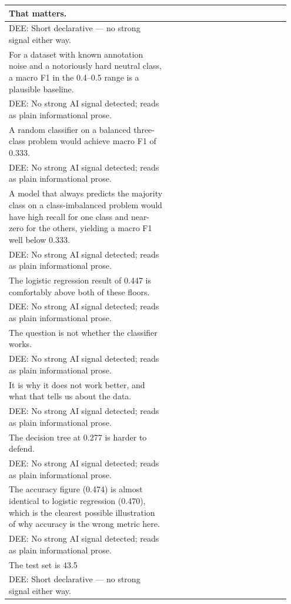 \documentclass[11pt]{article}
\begin{document}
\begin{longtable}{|p{0.55\linewidth}|p{0.40\linewidth}|}
\hline
That matters. & \\[2pt]
\hline
DEE: Short declarative --- no strong signal either way. & \\
\hline
For a dataset with known annotation noise and a notoriously hard neutral class, a macro F1 in the 0.4--0.5 range is a plausible baseline. & \\[2pt]
\hline
DEE: No strong AI signal detected; reads as plain informational prose. & \\
\hline
A random classifier on a balanced three-class problem would achieve macro F1 of 0.333. & \\[2pt]
\hline
DEE: No strong AI signal detected; reads as plain informational prose. & \\
\hline
A model that always predicts the majority class on a class-imbalanced problem would have high recall for one class and near-zero for the others, yielding a macro F1 well below 0.333. & \\[2pt]
\hline
DEE: No strong AI signal detected; reads as plain informational prose. & \\
\hline
The logistic regression result of 0.447 is comfortably above both of these floors. & \\[2pt]
\hline
DEE: No strong AI signal detected; reads as plain informational prose. & \\
\hline
The question is not whether the classifier works. & \\[2pt]
\hline
DEE: No strong AI signal detected; reads as plain informational prose. & \\
\hline
It is why it does not work better, and what that tells us about the data. & \\[2pt]
\hline
DEE: No strong AI signal detected; reads as plain informational prose. & \\
\hline
The decision tree at 0.277 is harder to defend. & \\[2pt]
\hline
DEE: No strong AI signal detected; reads as plain informational prose. & \\
\hline
The accuracy figure (0.474) is almost identical to logistic regression (0.470), which is the clearest possible illustration of why accuracy is the wrong metric here. & \\[2pt]
\hline
DEE: No strong AI signal detected; reads as plain informational prose. & \\
\hline
The test set is 43.5 & \\[2pt]
\hline
DEE: Short declarative --- no strong signal either way. & \\

\end{longtable}
\end{document}

